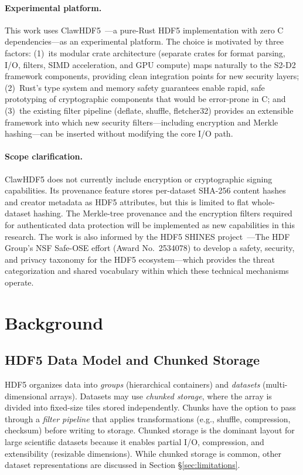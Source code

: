 \documentclass[11pt]{article}
\begin{document}
\paragraph{Experimental platform.}
This work uses ClawHDF5~\cite{clawhdf5}---a pure-Rust HDF5 implementation
with zero C dependencies---as an experimental platform. The choice is
motivated by three factors: (1)~its modular crate architecture (separate
crates for format parsing, I/O, filters, SIMD acceleration, and GPU compute)
maps naturally to the S2-D2 framework components, providing clean integration
points for new security layers; (2)~Rust's type system and memory safety
guarantees enable rapid, safe prototyping of cryptographic components that
would be error-prone in C; and (3)~the existing filter pipeline (deflate,
shuffle, fletcher32) provides an extensible framework into which new security
filters---including encryption and Merkle hashing---can be inserted without
modifying the core I/O path.

\paragraph{Scope clarification.}
ClawHDF5 does not currently include encryption or cryptographic signing
capabilities. Its provenance feature stores per-dataset SHA-256 content hashes
and creator metadata as HDF5 attributes, but this is limited to flat
whole-dataset hashing. The Merkle-tree provenance and the encryption filters
required for authenticated data protection will be implemented as new
capabilities in this research. The work is also informed by the HDF5 SHINES
project~\cite{shines}---The HDF Group's NSF Safe-OSE effort (Award
No.\ 2534078) to develop a safety, security, and privacy taxonomy for the
HDF5 ecosystem---which provides the threat categorization and shared
vocabulary within which these technical mechanisms operate.

\section{Background}
\label{sec:background}

\subsection{HDF5 Data Model and Chunked Storage}

HDF5 organizes data into \emph{groups} (hierarchical containers) and
\emph{datasets} (multi-dimensional arrays). Datasets may use \emph{chunked
storage}, where the array is divided into fixed-size tiles stored
independently. Chunks have the option to pass through a \emph{filter pipeline} that applies
transformations (e.g., shuffle, compression, checksum) before writing to storage.
Chunked storage is the dominant layout for large scientific datasets because it
enables partial I/O, compression, and extensibility (resizable dimensions).
While chunked storage is common, other dataset representations are discussed in
Section \S\ref{sec:limitations}.
\end{document}
